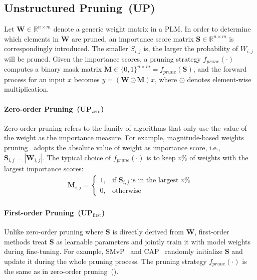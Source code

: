 \subsection{Unstructured  Pruning~(UP)}
\label{sec:pruning}
Let $\bm{W}\in \mathbb{R}^{n\times m}$ denote a generic weight matrix in a PLM. In order to determine which elements in $\bm{W}$ are pruned, an importance score matrix $\bm{S}\in \mathbb{R}^{n\times m}$ is correspondingly introduced. The smaller $S_{i,j}$ is, the larger the probability of $W_{i,j}$ will be pruned. Given the importance scores, a pruning strategy $f_{prune}(\cdot)$ computes a binary mask matrix $\bm{M}\in \{0,1\}^{n\times m}=f_{prune}(\bm{S})$, 
and the forward process for an input $x$ becomes $y=(\bm{W}\odot\bm{M})x$, 
where $\odot$ denotes element-wise multiplication.

\paragraph{Zero-order Pruning~(UP$_{\text{zero}}$)} Zero-order pruning refers to the family of algorithms that only use the value of the weight as the importance measure.
For example, magnitude-based weights pruning~\cite{mag,chen2020lottery} adopts the absolute value of weight as importance score, i.e., 
$\bm{S}_{i, j}=|\bm{W}_{i, j}|$. The typical choice of $f_{prune}(\cdot)$ is to keep $v\%$  of weights with the largest importance scores:
\begin{align}
	\bm{M}_{i,j}=
	\begin{cases} 
		1, & \text{if }\bm{S}_{i,j}~\text{is in the largest }v\%\\
		0,  & \text{otherwise}  
	\end{cases}
	\label{eq:zero}
\end{align}


\paragraph{First-order Pruning~(UP$_\text{first}$)} Unlike zero-order pruning where $\bm{S}$ is directly derived from $\bm{W}$, first-order methods treat 
$\bm{S}$ as learnable parameters and jointly train it with model weights 
during fine-tuning. For example, SMvP~\cite{movement} and CAP~\cite{cap}
randomly initialize $\bm{S}$ and update it during the whole pruning process. The pruning strategy $f_{prune}(\cdot)$ is the same as in zero-order pruning~().


